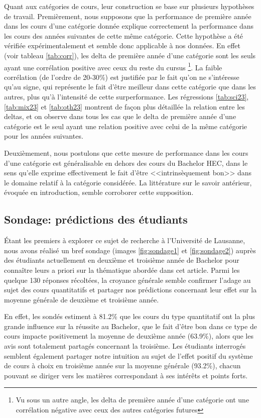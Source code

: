 Quant aux catégories de cours, leur construction se base sur plusieurs hypothèses de travail. Premièrement, nous supposons que la performance de première année dans les cours d'une catégorie donnée explique correctement la performance dans les cours des années suivantes de cette même catégorie. Cette hypothèse a été vérifiée expérimentalement et semble donc applicable à nos données. En effet (voir tableau \ref{tab:corr}), les delta de première année d'une catégorie sont les seuls ayant une corrélation positive avec ceux du reste du cursus \footnote{Vu sous un autre angle, les delta de première année d'une catégorie ont une corrélation négative avec ceux des autres catégories futures}. La faible corrélation (de l'ordre de 20-30\%) est justifiée par le fait qu'on ne s'intéresse qu'au signe, qui représente le fait d'être meilleur dans cette catégorie que dans les autres, plus qu'à l'intensité de cette surperformance. Les régressions \ref{tab:sci23}, \ref{tab:mix23} et \ref{tab:oth23} montrent de façon plus détaillée la relation entre les deltas, et on observe dans tous les cas que le delta de première année d'une catégorie est le seul ayant une relation positive avec celui de la même catégorie pour les années suivantes.

Deuxièmement, nous postulons que cette mesure de performance dans les cours d'une catégorie est généralisable en dehors des cours du Bachelor HEC, dans le sens qu'elle exprime effectivement le fait d'être <<intrinsèquement bon>> dans le domaine relatif à la catégorie considérée. La littérature sur le savoir antérieur, évoquée en introduction, semble corroborer cette supposition. 


\subsection{Sondage: prédictions des étudiants}


Étant les premiers à explorer ce sujet de recherche à l’Université de Lausanne, nous avons réalisé un bref sondage (images \ref{fig:sondage1} et \ref{fig:sondage2}) auprès des étudiants actuellement en deuxième et troisième année de Bachelor pour connaître leurs a priori sur la thématique abordée dans cet article. Parmi les quelque 130 réponses récoltées, la croyance générale semble confirmer l’adage au sujet des cours quantitatifs et partager nos prédictions concernant leur effet sur la moyenne générale de deuxième et troisième année.

En effet, les sondés estiment à 81.2\% que les cours du type quantitatif ont la plus grande influence sur la réussite au Bachelor, que le fait d'être bon dans ce type de cours impacte positivement la moyenne de deuxième année (63.9\%), alors que les avis sont totalement partagés concernant la troisième. Les étudiants interrogés semblent également partager notre intuition au sujet de l'effet positif du système de cours à choix en troisième année sur la moyenne générale (93.2\%), chacun pouvant se diriger vers les matières correspondant à ses intérêts et points forts.
